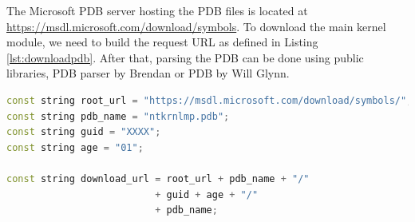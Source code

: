 The Microsoft PDB server hosting the PDB files is located at
\url{https://msdl.microsoft.com/download/symbols}. To download the main kernel
module, we need to build the request URL as defined in Listing
\ref{lst:downloadpdb}. After that, parsing the PDB can be done using public
libraries, PDB parser by Brendan\cite{pdbparse} or PDB by Will
Glynn\cite{pdbrust}.

\begin{lstlisting}[language=cpp,caption=Download PDB file,label={lst:downloadpdb},float,floatplacement=H]
const string root_url = "https://msdl.microsoft.com/download/symbols/";
const string pdb_name = "ntkrnlmp.pdb";
const string guid = "XXXX";
const string age = "01";

const string download_url = root_url + pdb_name + "/"
                          + guid + age + "/"
                          + pdb_name;
\end{lstlisting}
